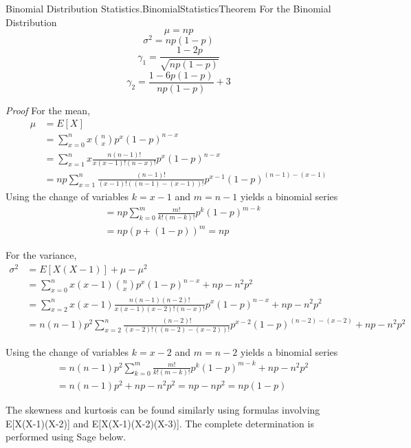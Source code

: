 \documentclass[10pt,]{book}
\makeatletter
\renewcommand*{\proofname}{Proof}
\renewenvironment{proof}[1][\proofname]{\par
  \pushQED{\qed}%
  \normalfont \topsep6\p@\@plus6\p@\relax
  \trivlist
  \item\relax
    {\itshape
    #1\@addpunct{.}}\hspace\labelsep\ignorespaces
}{%
  \popQED\endtrivlist\@endpefalse
}
\numberwithin{equation}{section}
\makeatother
\begin{document}
%
\par
\hypertarget{p-910}{}%
\begin{theorem}{Binomial Distribution Statistics.}{}{BinomialStatisticsTheorem}%
\hypertarget{BinomialStatistics}{}%
For the Binomial Distribution%
\begin{equation*}
\mu = np
\end{equation*}
%
\begin{equation*}
\sigma^2 = np(1-p)
\end{equation*}
%
\begin{equation*}
\gamma_1 = \frac{1-2p}{\sqrt{np(1-p)}}
\end{equation*}
%
\begin{equation*}
\gamma_2 = \frac{1-6p(1-p)}{np(1-p)} + 3
\end{equation*}
%
\end{theorem}
\begin{proof}\hypertarget{proof-41}{}
\hypertarget{p-912}{}%
For the mean,%
\begin{align*}
\mu & = E[X] \\
& = \sum_{x=0}^{n} {x \binom{n}{x} p^x (1-p)^{n-x}}\\
& = \sum_{x=1}^{n} {x \frac{n(n-1)!}{x(x-1)!(n-x)!} p^x (1-p)^{n-x}}\\
& = np \sum_{x=1}^{n} {\frac{(n-1)!}{(x-1)!((n-1)-(x-1))!} p^{x-1} (1-p)^{(n-1)-(x-1)}}
\end{align*}
Using the change of variables \(k=x-1\) and \(m = n-1\) yields a binomial series%
\begin{align*}
& = np \sum_{k=0}^{m} {\frac{m!}{k!(m-k)!} p^k (1-p)^{m-k}}\\
& = np (p + (1-p))^m = np
\end{align*}
%
\par
\hypertarget{p-913}{}%
For the variance,%
\begin{align*}
\sigma^2 & = E[X(X-1)] + \mu - \mu^2 \\
& = \sum_{x=0}^{n} {x(x-1) \binom{n}{x} p^x (1-p)^{n-x}} + np - n^2p^2\\
& = \sum_{x=2}^{n} {x(x-1) \frac{n(n-1)(n-2)!}{x(x-1)(x-2)!(n-x)!} p^x (1-p)^{n-x}}  + np - n^2p^2\\
& = n(n-1)p^2 \sum_{x=2}^{n} {\frac{(n-2)!}{(x-2)!((n-2)-(x-2))!} p^{x-2} (1-p)^{(n-2)-(x-2)}} + np - n^2p^2
\end{align*}
%
\par
\hypertarget{p-914}{}%
Using the change of variables \(k=x-2\) and \(m = n-2\) yields a binomial series%
\begin{align*}
& = n(n-1)p^2  \sum_{k=0}^{m} {\frac{m!}{k!(m-k)!} p^k (1-p)^{m-k}} + np - n^2p^2\\
& = n(n-1)p^2 + np - n^2p^2 = np - np^2 = np(1-p)
\end{align*}
%
\par
\hypertarget{p-915}{}%
The skewness and kurtosis can be found similarly using formulas involving E[X(X-1)(X-2)] and E[X(X-1)(X-2)(X-3)]. The complete determination is performed using Sage below.%
\end{proof}
\end{document}
